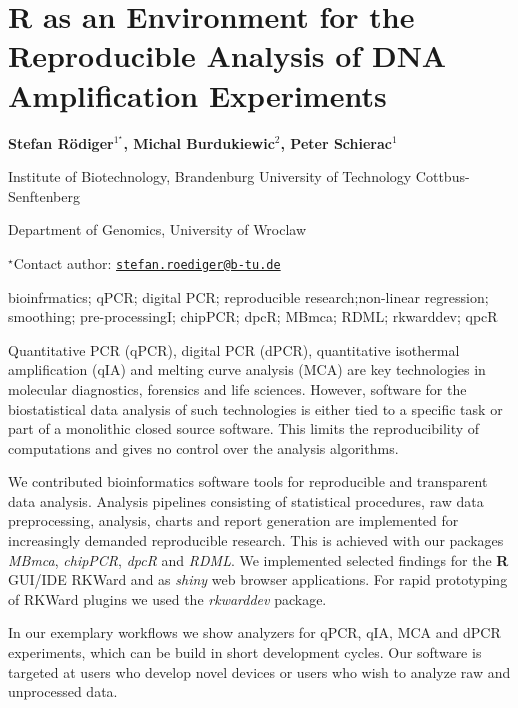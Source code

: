 \documentclass[\main/boa.tex]{subfiles}
\begin{document}
\pagestyle{empty}

\section{R as an Environment for the Reproducible Analysis of DNA Amplification
Experiments}

\begin{center}
  {\bf Stefan Rödiger$^{1^\star}$, Michal Burdukiewic$^{2}$, Peter Schierac$^{1}$}
\end{center}

\vskip 0.3cm

\begin{affiliations}
\begin{enumerate}
\begin{minipage}{0.915\textwidth}
\centering
\item Institute of Biotechnology, Brandenburg University of Technology
Cottbus-Senftenberg \\[-2pt]
\item Department of Genomics, University of Wroclaw \\[-2pt]
\end{minipage}
\end{enumerate}
$^\star$Contact author: \href{mailto:stefan.roediger@b-tu.de}{\nolinkurl{stefan.roediger@b-tu.de}}\\
\end{affiliations}

\vskip 0.5cm

\begin{minipage}{0.915\textwidth}
\keywords bioinfrmatics; qPCR; digital PCR; reproducible research;non-linear
regression; smoothing; pre-processingI;
\packages chipPCR; dpcR; MBmca; RDML; rkwarddev; qpcR
\end{minipage}

\vskip 0.8cm

Quantitative PCR (qPCR), digital PCR (dPCR), quantitative isothermal
amplification (qIA) and melting curve analysis (MCA) are key
technologies in molecular diagnostics, forensics and life sciences.
However, software for the biostatistical data analysis of such
technologies is either tied to a specific task or part of a monolithic
closed source software. This limits the reproducibility of computations
and gives no control over the analysis algorithms.

We contributed bioinformatics software tools for reproducible and
transparent data analysis. Analysis pipelines consisting of statistical
procedures, raw data preprocessing, analysis, charts and report
generation are implemented for increasingly demanded reproducible
research. This is achieved with our packages \emph{MBmca},
\emph{chipPCR}, \emph{dpcR} and \emph{RDML}. We implemented selected
findings for the \textbf{R} GUI/IDE RKWard and as \emph{shiny} web
browser applications. For rapid prototyping of RKWard plugins we used
the \emph{rkwarddev} package.

In our exemplary workflows we show analyzers for qPCR, qIA, MCA and dPCR
experiments, which can be build in short development cycles. Our
software is targeted at users who develop novel devices or users who
wish to analyze raw and unprocessed data.
\end{document}
